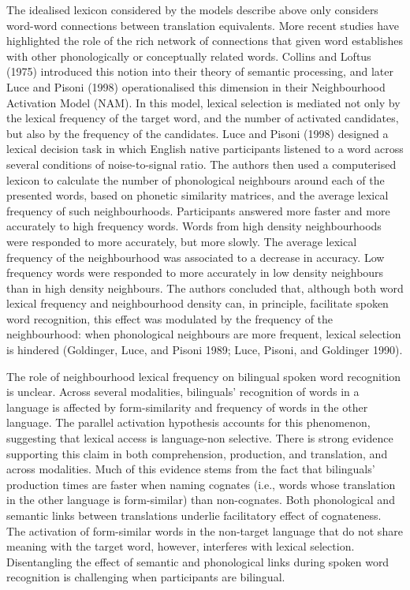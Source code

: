 \documentclass[
  man]{apa6}
\begin{document}
The idealised lexicon considered by the models describe above only
considers word-word connections between translation equivalents. More
recent studies have highlighted the role of the rich network of
connections that given word establishes with other phonologically or
conceptually related words. Collins and Loftus (1975) introduced this
notion into their theory of semantic processing, and later Luce and
Pisoni (1998) operationalised this dimension in their Neighbourhood
Activation Model (NAM). In this model, lexical selection is mediated not
only by the lexical frequency of the target word, and the number of
activated candidates, but also by the frequency of the candidates. Luce
and Pisoni (1998) designed a lexical decision task in which English
native participants listened to a word across several conditions of
noise-to-signal ratio. The authors then used a computerised lexicon to
calculate the number of phonological neighbours around each of the
presented words, based on phonetic similarity matrices, and the average
lexical frequency of such neighbourhoods. Participants answered more
faster and more accurately to high frequency words. Words from high
density neighbourhoods were responded to more accurately, but more
slowly. The average lexical frequency of the neighbourhood was
associated to a decrease in accuracy. Low frequency words were responded
to more accurately in low density neighbours than in high density
neighbours. The authors concluded that, although both word lexical
frequency and neighbourhood density can, in principle, facilitate spoken
word recognition, this effect was modulated by the frequency of the
neighbourhood: when phonological neighbours are more frequent, lexical
selection is hindered (Goldinger, Luce, and Pisoni 1989; Luce, Pisoni,
and Goldinger 1990).

The role of neighbourhood lexical frequency on bilingual spoken word
recognition is unclear. Across several modalities, bilinguals'
recognition of words in a language is affected by form-similarity and
frequency of words in the other language. The parallel activation
hypothesis accounts for this phenomenon, suggesting that lexical access
is language-non selective. There is strong evidence supporting this
claim in both comprehension, production, and translation, and across
modalities. Much of this evidence stems from the fact that bilinguals'
production times are faster when naming cognates (i.e., words whose
translation in the other language is form-similar) than non-cognates.
Both phonological and semantic links between translations underlie
facilitatory effect of cognateness. The activation of form-similar words
in the non-target language that do not share meaning with the target
word, however, interferes with lexical selection. Disentangling the
effect of semantic and phonological links during spoken word recognition
is challenging when participants are bilingual.
\end{document}
